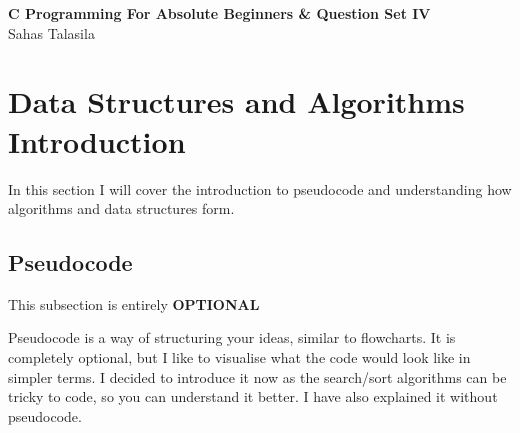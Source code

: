 \documentclass[a4paper,12pt]{article}
\begin{document}
\pagestyle{empty} 

\begin{titlepage}
    \centering
    \vspace*{2cm}
    \Huge{\textbf{C Programming For Absolute Beginners \& Question Set IV}} \\[1.5cm]
    \Large{Sahas Talasila} \\[1cm]
    \vfill
\end{titlepage}

\tableofcontents
\newpage

\section{Data Structures and Algorithms Introduction}

In this section I will cover the introduction to pseudocode and understanding how algorithms and data structures form.

\subsection{Pseudocode}

\begin{center}
    This subsection is entirely \textbf{OPTIONAL}
\end{center}

Pseudocode is a way of structuring your ideas, similar to flowcharts. It is completely optional, but I like to visualise what the code would look like in simpler terms. I decided to introduce it now as the search/sort algorithms can be tricky to code, so you can understand it better. I have also explained it without pseudocode. 
\end{document}
